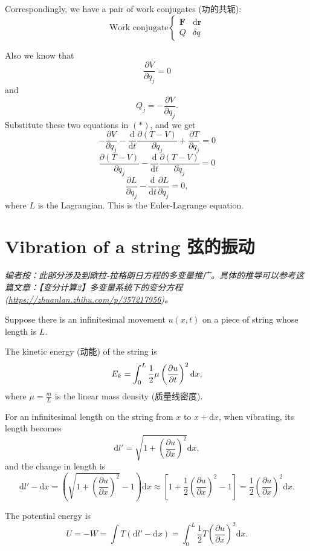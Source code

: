 Correspondingly, we have a pair of work conjugates (功的共轭):
\[\text{Work conjugate}
\left\{
\begin{array}{ll}
    \boldsymbol{F} & \mathrm{d} \boldsymbol{r} \\
    Q & \delta q
\end{array}
\right.\]

Also we know that \[\frac{\partial V}{\partial \dot{q}_j} = 0\] and
\[Q_j = - \frac{\partial V}{\partial q_j}.\] Substitute these two
equations in \((*)\), and we get
\[- \frac{\partial V}{\partial q_j} - \frac{\mathrm{d}}{\mathrm{d}t} \frac{\partial (T - V)}{\partial \dot{q}_j} + \frac{\partial T}{\partial q_j} = 0\]
\[\frac{\partial (T - V)}{\partial q_j} - \frac{\mathrm{d}}{\mathrm{d}t} \frac{\partial (T - V)}{\partial \dot{q}_j} = 0\]
\[\frac{\partial L}{\partial q_j} - \frac{\mathrm{d}}{\mathrm{d}t} \frac{\partial L}{\partial \dot{q}_j} = 0,\]
where \(L\) is the Lagrangian. This is the Euler-Lagrange equation.

\section{Vibration of a string
弦的振动}\label{vibration-of-a-string-ux5f26ux7684ux632fux52a8}

\emph{编者按：此部分涉及到欧拉-拉格朗日方程的多变量推广。具体的推导可以参考这篇文章：【变分计算2】多变量系统下的变分方程
(\url{https://zhuanlan.zhihu.com/p/357217956})。}

Suppose there is an infinitesimal movement \(u(x, t)\) on a piece of
string whose length is \(L\).

The kinetic energy (动能) of the string is
\[E_k = \int_{0}^{L} {1 \over 2} \mu \left( \frac{\partial u}{\partial t} \right)^2 \mathrm{d}x,\]
where \(\displaystyle \mu = \frac{m}{L}\) is the linear mass density
(质量线密度).

For an infinitesimal length on the string from \(x\) to
\(x + \mathrm{d}x\), when vibrating, its length becomes
\[\mathrm{d}l' = \sqrt{1 + \left( \frac{\partial u}{\partial x} \right)^2} \mathrm{d}x,\]
and the change in length is
\[\mathrm{d}l' - \mathrm{d}x = \left( \sqrt{1 + \left( \frac{\partial u}{\partial x} \right)^2} - 1 \right) \mathrm{d}x \approx \left[ 1 + \frac{1}{2} \left( \frac{\partial u}{\partial x} \right)^2 - 1 \right] = \frac{1}{2} \left( \frac{\partial u}{\partial x} \right)^2 \mathrm{d}x.\]

The potential energy is
\[U = - W = \int T (\mathrm{d}l' - \mathrm{d}x) = \int_{0}^{L} \frac{1}{2} T \left( \frac{\partial u}{\partial x} \right)^2 \mathrm{d}x.\]

